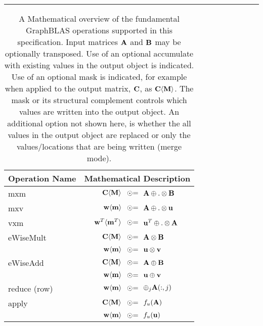 \begin{table*}[h]
\hrule
\begin{center}
\caption{A Mathematical overview of the fundamental GraphBLAS operations supported
in this specification.  Input matrices ${\bf A}$ and ${\bf B}$ may be 
optionally transposed. Use of an optional accumulate with existing values in the output object is indicated. Use of an optional mask is indicated, for example when applied to the output matrix, ${\bf C}$, as 
${\bf C}\langle{\bf M}\rangle$. The mask or its structural complement 
controls which values are written into the output object.  An additional option
not shown here, is whether the all values in the output object are replaced or only the values/locations that are being written (merge mode).}
\label{Tab:GraphBLASOps}
\newcommand{\odotequals}{\hspace{-0.3cm}\odot\hspace{-0.09cm}=\hspace{-0.2cm}}
\begin{tabular}{l|rrl}
{\sf Operation Name} & \multicolumn{3}{c}{Mathematical Description}  \\
\hline
{\sf mxm}          & ${\bf C}\langle{\bf M}\rangle$ & $\odotequals$ & ${\bf A} \oplus.\otimes {\bf B}$  \\
{\sf mxv}          & ${\bf w}\langle{\bf m}\rangle$ & $\odotequals$ & ${\bf A} \oplus.\otimes {\bf u}$  \\
{\sf vxm}          & ${\bf w}^T\langle{\bf m}^T\rangle$ & $\odotequals$ & ${\bf u}^T \oplus.\otimes {\bf A}$  \\
{\sf eWiseMult}    & ${\bf C}\langle{\bf M}\rangle$ & $\odotequals$ & ${\bf A} \otimes {\bf B}$  \\
                   & ${\bf w}\langle{\bf m}\rangle$ & $\odotequals$ & ${\bf u} \otimes {\bf v}$  \\
{\sf eWiseAdd}     & ${\bf C}\langle{\bf M}\rangle$ & $\odotequals$ & ${\bf A} \oplus  {\bf B}$  \\
                   & ${\bf w}\langle{\bf m}\rangle$ & $\odotequals$ & ${\bf u} \oplus {\bf v}$  \\
{\sf reduce} (row) & ${\bf w}\langle{\bf m}\rangle$ & $\odotequals$ & $\oplus_j{\bf A}(:,j)$  \\
{\sf apply}        & ${\bf C}\langle{\bf M}\rangle$ & $\odotequals$ & $f_u({\bf A})$ \\
                   & ${\bf w}\langle{\bf m}\rangle$ & $\odotequals$ & $f_u({\bf u} )$  \\

\end{tabular}
\end{center}
\end{table*}
